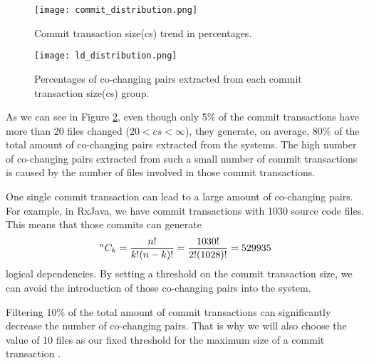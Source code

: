 \begin{figure}[!h]
\centering
\texttt{[image: commit\_distribution.png]}
\caption{Commit transaction size(cs) trend in percentages.}
\label{fig:fig_cs}
\centering
\end{figure}


\begin{figure}[!h]
\centering
\texttt{[image: ld\_distribution.png]}
\caption{Percentages of co-changing pairs extracted from each commit transaction size(cs) group.}
\label{fig:fig_ld_cs}
\centering
\end{figure}

As we can see in Figure \ref{fig:fig_ld_cs}, even though only 5\% of the commit transactions have more than 20 files changed ($20<cs<\infty$), they generate, on average, 80\% of the total amount of co-changing pairs extracted from the systems.  
The high number of co-changing pairs extracted from such a small number of commit transactions is caused by the number of files involved in those commit transactions.  

One single commit transaction can lead to a large amount of co-changing pairs. For example, in RxJava, we have commit transactions with 1030 source code files. This means that those commits can generate  
\[
{}^{n}C_{k}=\frac{n!}{k!(n-k)!} = \frac{1030!}{2!(1028)!} = 529 935
\]
logical dependencies. By setting a threshold on the commit transaction size, we can avoid the introduction of those co-changing pairs into the system.  

Filtering 10\% of the total amount of commit transactions can significantly decrease the number of co-changing pairs. That is why we will also choose the value of 10 files as our fixed threshold for the maximum size of a commit transaction \cite{DepSACI}.



